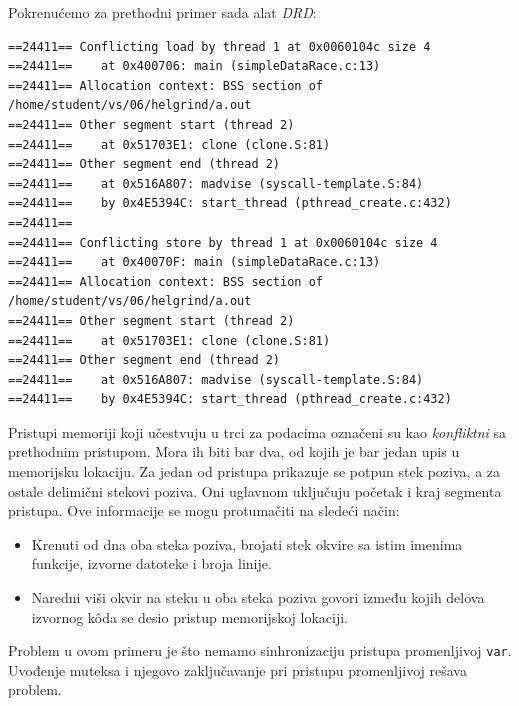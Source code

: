 Pokrenućemo za prethodni primer sada alat \emph{DRD}:

\begin{verbatim}
==24411== Conflicting load by thread 1 at 0x0060104c size 4
==24411==    at 0x400706: main (simpleDataRace.c:13)
==24411== Allocation context: BSS section of /home/student/vs/06/helgrind/a.out
==24411== Other segment start (thread 2)
==24411==    at 0x51703E1: clone (clone.S:81)
==24411== Other segment end (thread 2)
==24411==    at 0x516A807: madvise (syscall-template.S:84)
==24411==    by 0x4E5394C: start_thread (pthread_create.c:432)
==24411==
==24411== Conflicting store by thread 1 at 0x0060104c size 4
==24411==    at 0x40070F: main (simpleDataRace.c:13)
==24411== Allocation context: BSS section of /home/student/vs/06/helgrind/a.out
==24411== Other segment start (thread 2)
==24411==    at 0x51703E1: clone (clone.S:81)
==24411== Other segment end (thread 2)
==24411==    at 0x516A807: madvise (syscall-template.S:84)
==24411==    by 0x4E5394C: start_thread (pthread_create.c:432)
\end{verbatim}

Pristupi memoriji koji učestvuju u trci za podacima označeni su kao \emph{konfliktni} sa prethodnim pristupom. Mora ih biti bar dva, od kojih je bar jedan upis u memorijsku lokaciju. Za jedan od pristupa prikazuje se potpun stek poziva, a za ostale delimični stekovi poziva. Oni uglavnom uključuju početak i kraj segmenta pristupa. Ove informacije se mogu protumačiti na sledeći način:

\begin{itemize}
\item
  Krenuti od dna oba steka poziva, brojati stek okvire sa istim imenima funkcije, izvorne datoteke i broja linije.
\item
  Naredni viši okvir na steku u oba steka poziva govori između kojih delova izvornog kôda se desio pristup memorijskoj lokaciji.
\end{itemize}

Problem u ovom primeru je što nemamo sinhronizaciju pristupa promenljivoj \texttt{var}. Uvođenje muteksa i njegovo zaključavanje pri pristupu promenljivoj rešava problem.
